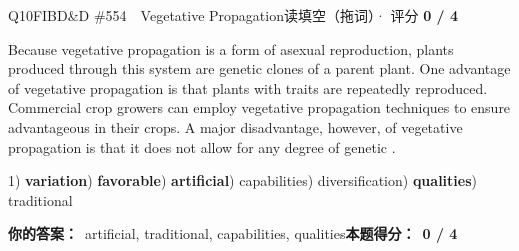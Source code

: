 \begin{qblock}{Q10\quad FIBD\&D \#554\ \ Vegetative Propagation}{读填空（拖词）· 评分 \textcolor{cAccent}{\bfseries 0 / 4}}
\begin{promptbox}
Because vegetative propagation is a form of asexual reproduction, plants produced through this system are genetic clones of a parent plant. One advantage of vegetative propagation is that plants with  traits are repeatedly reproduced. Commercial crop growers can employ  vegetative propagation techniques to ensure advantageous  in their crops. A major disadvantage, however, of vegetative propagation is that it does not allow for any degree of genetic .
\end{promptbox}
{\small 1) \textbf{variation}) \textbf{favorable}) \textbf{artificial}) capabilities) diversification) \textbf{qualities}) traditional}
\par\smallskip
\textbf{你的答案：}\ {\color{cWrong}artificial, traditional, capabilities, qualities}\qquad\textbf{本题得分：}\ {\color{cAccent}\bfseries 0 / 4}
\end{qblock}

